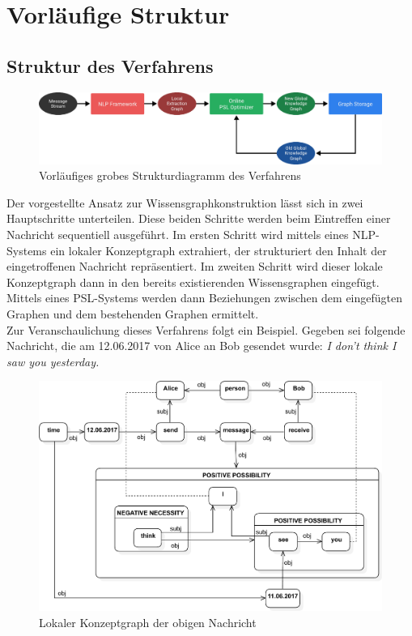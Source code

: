 \documentclass[11pt, a4paper]{scrreprt}
\begin{document}
\section{Vorläufige Struktur}

\subsection{Struktur des Verfahrens}

\begin{figure}[h]
	\centering
	\includegraphics[width=\linewidth]{assets/overview}
	\caption{Vorläufiges grobes Strukturdiagramm des Verfahrens}\label{fig:overview}
\end{figure}

Der vorgestellte Ansatz zur Wissensgraphkonstruktion lässt sich in zwei Hauptschritte unterteilen.
Diese beiden Schritte werden beim Eintreffen einer Nachricht sequentiell ausgeführt.
Im ersten Schritt wird mittels eines NLP-Systems ein lokaler Konzeptgraph extrahiert, der strukturiert den Inhalt der eingetroffenen Nachricht repräsentiert.
Im zweiten Schritt wird dieser lokale Konzeptgraph dann in den bereits existierenden Wissensgraphen eingefügt.
Mittels eines PSL-Systems werden dann Beziehungen zwischen dem eingefügten Graphen und dem bestehenden Graphen ermittelt.\\

Zur Veranschaulichung dieses Verfahrens folgt ein Beispiel.
Gegeben sei folgende Nachricht, die am 12.06.2017 von Alice an Bob gesendet wurde:
\emph{I don't think I saw you yesterday.}

\begin{figure}[h]
	\centering
	\includegraphics[width=0.8\linewidth]{assets/exampleExtractionGraph}
	\caption{Lokaler Konzeptgraph der obigen Nachricht}\label{fig:exampleExtractionGraph}
\end{figure}
\end{document}
